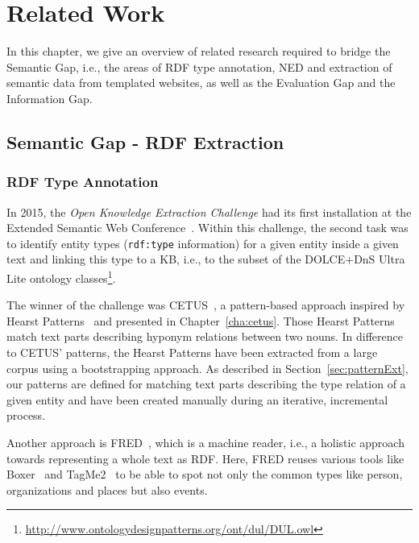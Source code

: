 \chapter{Related Work}



In this chapter, we give an overview of related research required to bridge the Semantic Gap, i.e., the areas of \ac{RDF} type annotation, \ac{NED} and extraction of semantic data from templated websites, as well as the Evaluation Gap and the Information Gap.

\section{Semantic Gap - RDF Extraction}
\subsection{RDF Type Annotation}

In 2015, the \emph{Open Knowledge Extraction Challenge} had its first installation at the Extended Semantic Web Conference~\cite{okechallenge}.
Within this challenge, the second task was to identify entity types (\texttt{rdf:type} information) for a given entity inside a given text and linking this type to a \ac{KB}, i.e., to the subset of the DOLCE+DnS Ultra Lite ontology classes\footnote{\url{http://www.ontologydesignpatterns.org/ont/dul/DUL.owl}}.

The winner of the challenge was CETUS~\cite{CETUS_2015}, a pattern-based approach inspired by  Hearst Patterns~\cite{Hearst1992} and presented in Chapter~\ref{cha:cetus}.
Those Hearst Patterns match text parts describing hyponym relations between two nouns.
In difference to CETUS' patterns, the Hearst Patterns have been extracted from a large corpus using a bootstrapping approach.
As described in Section~\ref{sec:patternExt}, our patterns are defined for matching text parts describing the type relation of a given entity and have been created manually during an iterative, incremental process.

Another approach is FRED~\cite{fred_typing}, which is a machine reader, i.e., a holistic approach towards representing a whole text as \ac{RDF}. 
Here, FRED reuses various tools like Boxer~\citep{Bos:2008:WSA:1626481.1626503} and TagMe2~\cite{tagme2} to be able to spot not only the common types like person, organizations and places but also events.

